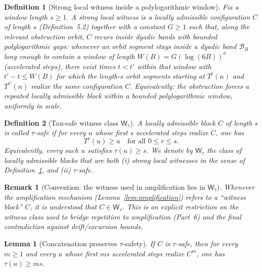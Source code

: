 \documentclass[preprint,12pt]{elsarticle}
\newtheorem{remark}{Remark}
\newtheorem{lemma}{Lemma}
\newtheorem{definition}{Definition}
\begin{document}
\begin{definition}[Strong local witness inside a polylogarithmic window]
\label{def:strong-witness-log}
Fix a window length $s\ge 1$.
A \emph{strong local witness} is a locally admissible configuration $C$ of length $s$
(Definition~5.2) together with a constant $G\ge 1$ such that, along the relevant
obstruction orbit, $C$ recurs inside dyadic bands with \emph{bounded polylogarithmic gaps}:
whenever an orbit segment stays inside a dyadic band $\mathcal{B}_B$ long enough to
contain a window of length $W(B)=G(\log(6B))^{\sigma}$ (accelerated steps), there exist times
$t<t'$ within that window with $t'-t\le W(B)$ for which the length-$s$ orbit segments
starting at $T^t(n)$ and $T^{t'}(n)$ realize the same configuration $C$.
Equivalently: the obstruction forces a repeated locally admissible block
within a bounded polylogarithmic window, uniformly in scale.
\end{definition}


\begin{definition}[Tau-safe witness class $\mathsf{W}_\tau$]
\label{def:tausafe-witness}
A locally admissible block $C$ of length $s$ is called \emph{$\tau$-safe} if for every
$u$ whose first $s$ accelerated steps realize $C$, one has
\[
T^r(u)\ge u\quad \text{for all } 0\le r\le s.
\]
Equivalently, every such $u$ satisfies $\tau(u)\ge s$.
We denote by $\mathsf{W}_\tau$ the class of locally admissible blocks that are both
(i) strong local witnesses in the sense of Definition~\ref{def:strong-witness-log}, and
(ii) $\tau$-safe.
\end{definition}

\begin{remark}[Convention: the witness used in amplification lies in $\mathsf{W}_\tau$]
\label{rem:amplification-uses-Wtau}
Whenever the amplification mechanism (Lemma~\ref{lem:amplification}) refers to a
“witness block” $C$, it is understood that $C\in\mathsf{W}_\tau$.
This is an explicit restriction on the witness class used to bridge repetition to amplification (Part~6) and the final contradiction against drift/excursion bounds.\end{remark}

\begin{lemma}[Concatenation preserves $\tau$-safety]
\label{lem:tausafe-concat}
If $C$ is $\tau$-safe, then for every $m\ge 1$ and every $u$ whose first $ms$ accelerated
steps realize $C^m$, one has $\tau(u)\ge ms$.
\end{lemma}
\end{document}
